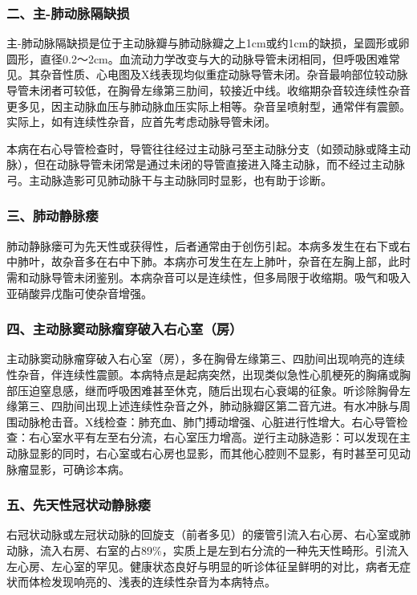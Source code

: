 \subsubsection{二、主-肺动脉隔缺损}

主-肺动脉隔缺损是位于主动脉瓣与肺动脉瓣之上1cm或约1cm的缺损，呈圆形或卵圆形，直径0.2～2cm。血流动力学改变与大的动脉导管未闭相同，但呼吸困难常见。其杂音性质、心电图及X线表现均似重症动脉导管未闭。杂音最响部位较动脉导管未闭者可较低，在胸骨左缘第三肋间，较接近中线。收缩期杂音较连续性杂音更多见，因主动脉血压与肺动脉血压实际上相等。杂音呈喷射型，通常伴有震颤。实际上，如有连续性杂音，应首先考虑动脉导管未闭。

本病在右心导管检查时，导管往往经过主动脉弓至主动脉分支（如颈动脉或降主动脉），但在动脉导管未闭常是通过未闭的导管直接进入降主动脉，而不经过主动脉弓。主动脉造影可见肺动脉干与主动脉同时显影，也有助于诊断。

\subsubsection{三、肺动静脉瘘}

肺动静脉瘘可为先天性或获得性，后者通常由于创伤引起。本病多发生在右下或右中肺叶，故杂音多在右中下肺。本病亦可发生在左上肺叶，杂音在左胸上部，此时需和动脉导管未闭鉴别。本病杂音可以是连续性，但多局限于收缩期。吸气和吸入亚硝酸异戊酯可使杂音增强。

\subsubsection{四、主动脉窦动脉瘤穿破入右心室（房）}

主动脉窦动脉瘤穿破入右心室（房），多在胸骨左缘第三、四肋间出现响亮的连续性杂音，伴连续性震颤。本病特点是起病突然，出现类似急性心肌梗死的胸痛或胸部压迫窒息感，继而呼吸困难甚至休克，随后出现右心衰竭的征象。听诊除胸骨左缘第三、四肋间出现上述连续性杂音之外，肺动脉瓣区第二音亢进。有水冲脉与周围动脉枪击音。X线检查：肺充血、肺门搏动增强、心脏进行性增大。右心导管检查：右心室水平有左至右分流，右心室压力增高。逆行主动脉造影：可以发现在主动脉显影的同时，右心室或右心房也显影，而其他心腔则不显影，有时甚至可见动脉瘤显影，可确诊本病。

\subsubsection{五、先天性冠状动静脉瘘}

右冠状动脉或左冠状动脉的回旋支（前者多见）的瘘管引流入右心房、右心室或肺动脉，流入右房、右室的占89\%，实质上是左到右分流的一种先天性畸形。引流入左心房、左心室的罕见。健康状态良好与明显的听诊体征呈鲜明的对比，病者无症状而体检发现响亮的、浅表的连续性杂音为本病特点。

